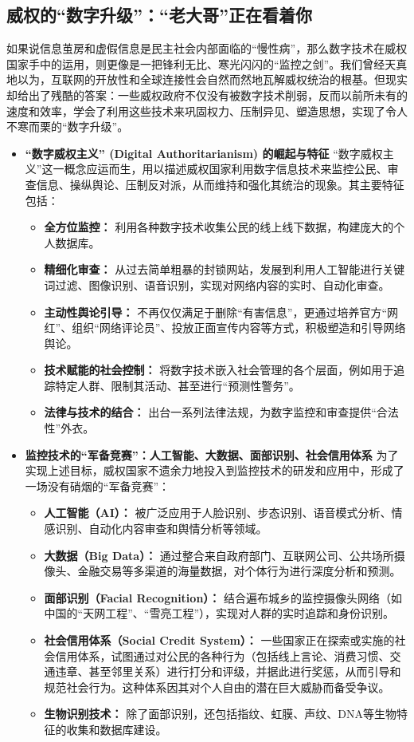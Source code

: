 \documentclass[UTF8, 10pt]{ctexbook}
\begin{document}
\subsection{威权的“数字升级”：“老大哥”正在看着你}
如果说信息茧房和虚假信息是民主社会内部面临的“慢性病”，那么数字技术在威权国家手中的运用，则更像是一把锋利无比、寒光闪闪的“监控之剑”。我们曾经天真地以为，互联网的开放性和全球连接性会自然而然地瓦解威权统治的根基。但现实却给出了残酷的答案：一些威权政府不仅没有被数字技术削弱，反而以前所未有的速度和效率，学会了利用这些技术来巩固权力、压制异见、塑造思想，实现了令人不寒而栗的“数字升级”。
\begin{itemize}
    \item \textbf{“数字威权主义” (Digital Authoritarianism) 的崛起与特征}
    “数字威权主义”这一概念应运而生，用以描述威权国家利用数字信息技术来监控公民、审查信息、操纵舆论、压制反对派，从而维持和强化其统治的现象。其主要特征包括：
    \begin{itemize}
        \item \textbf{全方位监控：} 利用各种数字技术收集公民的线上线下数据，构建庞大的个人数据库。
        \item \textbf{精细化审查：} 从过去简单粗暴的封锁网站，发展到利用人工智能进行关键词过滤、图像识别、语音识别，实现对网络内容的实时、自动化审查。
        \item \textbf{主动性舆论引导：} 不再仅仅满足于删除“有害信息”，更通过培养官方“网红”、组织“网络评论员”、投放正面宣传内容等方式，积极塑造和引导网络舆论。
        \item \textbf{技术赋能的社会控制：} 将数字技术嵌入社会管理的各个层面，例如用于追踪特定人群、限制其活动、甚至进行“预测性警务”。
        \item \textbf{法律与技术的结合：} 出台一系列法律法规，为数字监控和审查提供“合法性”外衣。
    \end{itemize}

    \item \textbf{监控技术的“军备竞赛”：人工智能、大数据、面部识别、社会信用体系}
    为了实现上述目标，威权国家不遗余力地投入到监控技术的研发和应用中，形成了一场没有硝烟的“军备竞赛”：
    \begin{itemize}
        \item \textbf{人工智能（AI）：} 被广泛应用于人脸识别、步态识别、语音模式分析、情感识别、自动化内容审查和舆情分析等领域。
        \item \textbf{大数据（Big Data）：} 通过整合来自政府部门、互联网公司、公共场所摄像头、金融交易等多渠道的海量数据，对个体行为进行深度分析和预测。
        \item \textbf{面部识别（Facial Recognition）：} 结合遍布城乡的监控摄像头网络（如中国的“天网工程”、“雪亮工程”），实现对人群的实时追踪和身份识别。
        \item \textbf{社会信用体系（Social Credit System）：} 一些国家正在探索或实施的社会信用体系，试图通过对公民的各种行为（包括线上言论、消费习惯、交通违章、甚至邻里关系）进行打分和评级，并据此进行奖惩，从而引导和规范社会行为。这种体系因其对个人自由的潜在巨大威胁而备受争议。
        \item \textbf{生物识别技术：} 除了面部识别，还包括指纹、虹膜、声纹、DNA等生物特征的收集和数据库建设。
    \end{itemize}


\end{itemize}
\end{document}
